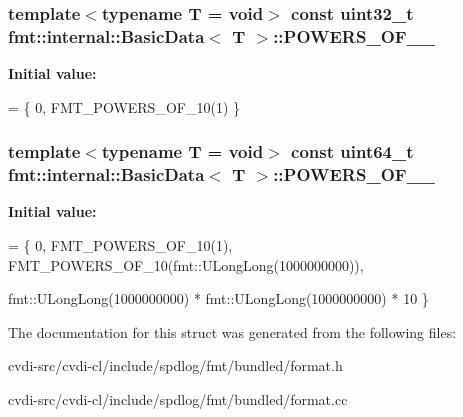 \subsubsection[{\texorpdfstring{P\+O\+W\+E\+R\+S\+\_\+\+O\+F\+\_\+10\+\_\+32}{POWERS_OF_10_32}}]{\setlength{\rightskip}{0pt plus 5cm}template$<$typename T  = void$>$ const uint32\+\_\+t {\bf fmt\+::internal\+::\+Basic\+Data}$<$ T $>$\+::P\+O\+W\+E\+R\+S\+\_\+\+O\+F\+\_\+\_\hspace{0.3cm}{\ttfamily [static]}}\hypertarget{structfmt_1_1internal_1_1BasicData_abbc4c0076211263be3f19cce9655caf7}{}\label{structfmt_1_1internal_1_1BasicData_abbc4c0076211263be3f19cce9655caf7}
{\bfseries Initial value\+:}
\begin{DoxyCode}
= \{
  0, FMT\_POWERS\_OF\_10(1)
\}
\end{DoxyCode}
\subsubsection[{\texorpdfstring{P\+O\+W\+E\+R\+S\+\_\+\+O\+F\+\_\+10\+\_\+64}{POWERS_OF_10_64}}]{\setlength{\rightskip}{0pt plus 5cm}template$<$typename T  = void$>$ const uint64\+\_\+t {\bf fmt\+::internal\+::\+Basic\+Data}$<$ T $>$\+::P\+O\+W\+E\+R\+S\+\_\+\+O\+F\+\_\+\_\hspace{0.3cm}{\ttfamily [static]}}\hypertarget{structfmt_1_1internal_1_1BasicData_a5f4f238cffad6816fbdc621e96b0e1d2}{}\label{structfmt_1_1internal_1_1BasicData_a5f4f238cffad6816fbdc621e96b0e1d2}
{\bfseries Initial value\+:}
\begin{DoxyCode}
= \{
  0,
  FMT\_POWERS\_OF\_10(1),
  FMT\_POWERS\_OF\_10(fmt::ULongLong(1000000000)),
  
  
  fmt::ULongLong(1000000000) * fmt::ULongLong(1000000000) * 10
\}
\end{DoxyCode}


The documentation for this struct was generated from the following files\+:\begin{DoxyCompactItemize}
\item 
cvdi-\/src/cvdi-\/cl/include/spdlog/fmt/bundled/format.\+h\item 
cvdi-\/src/cvdi-\/cl/include/spdlog/fmt/bundled/format.\+cc\end{DoxyCompactItemize}
